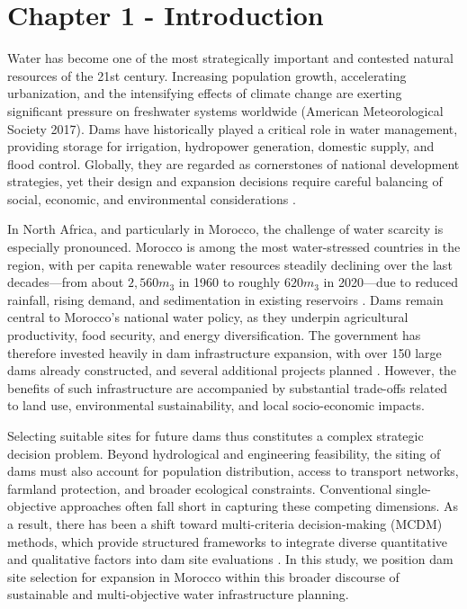 \section{Chapter 1 - Introduction}\label{sec:introduction}
Water has become one of the most strategically important and contested natural resources of the 21st century. Increasing population growth, accelerating urbanization, and the intensifying effects of climate change are exerting significant pressure on freshwater systems worldwide (American Meteorological Society 2017)\cite{AMS2017}. Dams have historically played a critical role in water management, providing storage for irrigation, hydropower generation, domestic supply, and flood control. Globally, they are regarded as cornerstones of national development strategies, yet their design and expansion decisions require careful balancing of social, economic, and environmental considerations \cite{Schmitt2024,AMS2017}.

In North Africa, and particularly in Morocco, the challenge of water scarcity is especially pronounced. Morocco is among the most water-stressed countries in the region, with per capita renewable water resources steadily declining over the last decades—from about $2,560m_3$ in 1960 to roughly $620m_3$ in 2020—due to reduced rainfall, rising demand, and sedimentation in existing reservoirs \cite{WorldBank2023}. Dams remain central to Morocco's national water policy, as they underpin agricultural productivity, food security, and energy diversification. The government has therefore invested heavily in dam infrastructure expansion, with over 150 large dams already constructed, and several additional projects planned \cite{TradeGov2024}. However, the benefits of such infrastructure are accompanied by substantial trade-offs related to land use, environmental sustainability, and local socio-economic impacts.

Selecting suitable sites for future dams thus constitutes a complex strategic decision problem. Beyond hydrological and engineering feasibility, the siting of dams must also account for population distribution, access to transport networks, farmland protection, and broader ecological constraints. Conventional single-objective approaches often fall short in capturing these competing dimensions. As a result, there has been a shift toward multi-criteria decision-making (MCDM) methods, which provide structured frameworks to integrate diverse quantitative and qualitative factors into dam site evaluations \cite{TradeGov2024,Minatour2015}. In this study, we position dam site selection  for expansion in Morocco within this broader discourse of sustainable and multi-objective water infrastructure planning.

